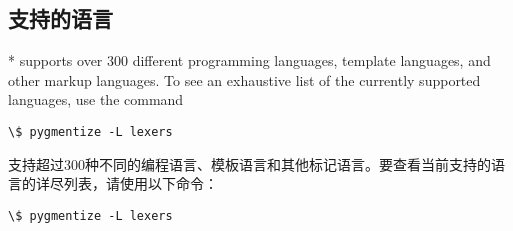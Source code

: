 \begin{paracol}{2}
\subsection{支持的语言}
\switchcolumn[0]*%
 supports over 300 different programming languages, template languages, and other markup languages.  To see an exhaustive list of the currently supported languages, use the command
\begin{Verbatim}[commandchars=\\\{\}]
\$ pygmentize -L lexers
\end{Verbatim}
\switchcolumn
{} 支持超过300种不同的编程语言、模板语言和其他标记语言。要查看当前支持的语言的详尽列表，请使用以下命令：
\begin{Verbatim}[commandchars=\\\{\}]
\$ pygmentize -L lexers
\end{Verbatim}
\end{paracol}